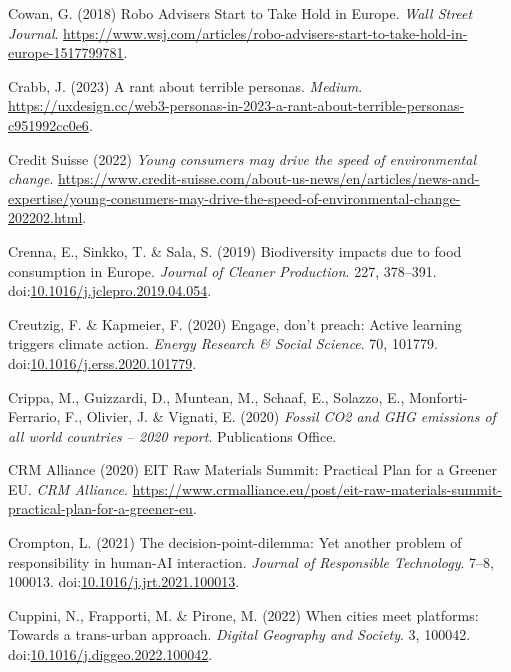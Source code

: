 \documentclass[
  letterpaper,
  DIV=11,
  numbers=noendperiod]{scrartcl}
\newlength{\cslhangindent}
\newenvironment{CSLReferences}[2] %
 {\begin{list}{}{%
  \setlength{\itemindent}{0pt}
  \setlength{\leftmargin}{0pt}
  \setlength{\parsep}{0pt}
  \ifodd #1
   \setlength{\leftmargin}{\cslhangindent}
   \setlength{\itemindent}{-1\cslhangindent}
  \fi
  \setlength{\itemsep}{#2\baselineskip}}}
 {\end{list}}
\begin{document}
\begin{CSLReferences}{0}{1}
Cowan, G. (2018) Robo {Advisers Start} to {Take Hold} in {Europe}.
\emph{Wall Street Journal}.
\url{https://www.wsj.com/articles/robo-advisers-start-to-take-hold-in-europe-1517799781}.

Crabb, J. (2023) A rant about terrible personas. \emph{Medium}.
\url{https://uxdesign.cc/web3-personas-in-2023-a-rant-about-terrible-personas-c951992cc0e6}.

Credit Suisse (2022) \emph{Young consumers may drive the speed of
environmental change}.
\url{https://www.credit-suisse.com/about-us-news/en/articles/news-and-expertise/young-consumers-may-drive-the-speed-of-environmental-change-202202.html}.

Crenna, E., Sinkko, T. \& Sala, S. (2019) Biodiversity impacts due to
food consumption in {Europe}. \emph{Journal of Cleaner Production}. 227,
378--391.
doi:\href{https://doi.org/10.1016/j.jclepro.2019.04.054}{10.1016/j.jclepro.2019.04.054}.

Creutzig, F. \& Kapmeier, F. (2020) Engage, don't preach: {Active}
learning triggers climate action. \emph{Energy Research \& Social
Science}. 70, 101779.
doi:\href{https://doi.org/10.1016/j.erss.2020.101779}{10.1016/j.erss.2020.101779}.

Crippa, M., Guizzardi, D., Muntean, M., Schaaf, E., Solazzo, E.,
Monforti-Ferrario, F., Olivier, J. \& Vignati, E. (2020) \emph{Fossil
{CO2} and {GHG} emissions of all world countries -- 2020 report}.
Publications Office.

CRM Alliance (2020) {EIT Raw Materials Summit}: {Practical Plan} for a
{Greener EU}. \emph{CRM Alliance}.
\url{https://www.crmalliance.eu/post/eit-raw-materials-summit-practical-plan-for-a-greener-eu}.

Crompton, L. (2021) The decision-point-dilemma: {Yet} another problem of
responsibility in human-{AI} interaction. \emph{Journal of Responsible
Technology}. 7--8, 100013.
doi:\href{https://doi.org/10.1016/j.jrt.2021.100013}{10.1016/j.jrt.2021.100013}.

Cuppini, N., Frapporti, M. \& Pirone, M. (2022) When cities meet
platforms: {Towards} a trans-urban approach. \emph{Digital Geography and
Society}. 3, 100042.
doi:\href{https://doi.org/10.1016/j.diggeo.2022.100042}{10.1016/j.diggeo.2022.100042}.


\end{CSLReferences}
\end{document}
